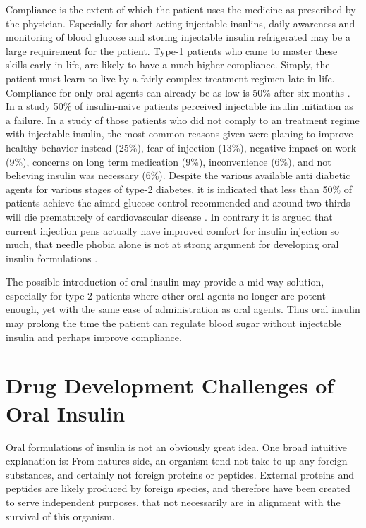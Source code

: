 Compliance is the extent of which the patient uses the medicine as prescribed by the physician. Especially for short acting injectable insulins, daily awareness and monitoring of blood glucose and storing injectable insulin refrigerated may be a large requirement for the patient. Type-1 patients who came to master these skills early in life, are likely to have a much higher compliance. Simply, the patient must learn to live by a fairly complex treatment regimen late in life. Compliance for only oral agents can already be as low is 50\% after six months \cite{garcia2013adherence}. In a study 50\% of insulin-naive patients perceived injectable insulin initiation as a failure. In a study of those patients who did not comply to an treatment regime with injectable insulin, the most common reasons given were planing to improve healthy behavior instead (25\%), fear of injection (13\%), negative impact on work (9\%), concerns on long term medication (9\%), inconvenience (6\%), and not believing insulin was necessary (6\%). Despite the various available anti diabetic agents for various stages of type-2 diabetes, it is indicated that less than 50\% of patients achieve the aimed glucose control recommended and around two-thirds will die prematurely of cardiovascular disease \cite{garcia2013adherence}. In contrary it is argued that current injection pens actually have improved comfort for insulin injection so much, that needle phobia alone is not at strong argument for developing oral insulin formulations \cite{maher2014formulation}.

The possible introduction of oral insulin may provide a mid-way solution, especially for type-2 patients where other oral agents no longer are potent enough, yet with the same ease of administration as oral agents. Thus oral insulin may prolong the time the patient can regulate blood sugar without injectable insulin and perhaps improve compliance.

\section{Drug Development Challenges of Oral Insulin}
Oral formulations of insulin is not an obviously great idea. One broad intuitive explanation is: From natures side, an organism tend not take to up any foreign substances, and certainly not foreign proteins or peptides. External proteins and peptides are likely produced by foreign species, and therefore have been created to serve independent purposes, that not necessarily are in alignment with the survival of this organism.

